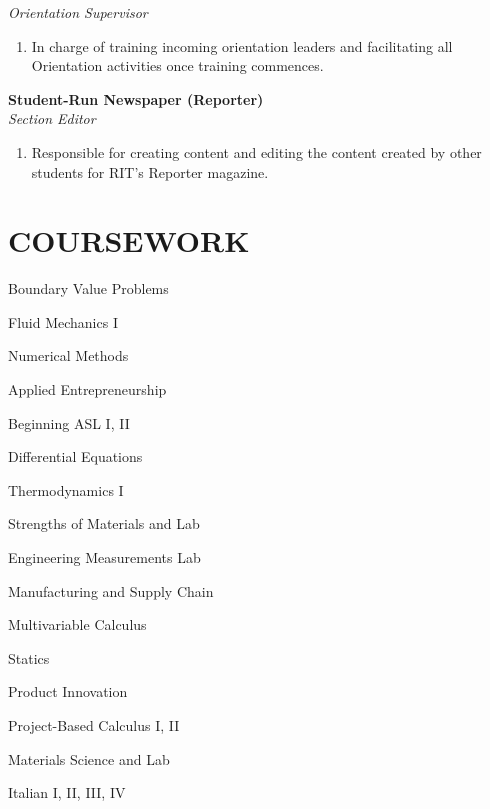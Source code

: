 \documentclass[line, resmargin]{res}
\begin{document}
\begin{resume}
\vspace{-6mm}

 \textit {Orientation Supervisor}
 \vspace{-6mm}
	\begin{enumerate}
		\item[]In charge of training incoming orientation leaders and facilitating all Orientation activities once training commences.
		\end{enumerate}
\vspace{-4mm}
\textbf{Student-Run Newspaper (Reporter)}\\
\textit {Section Editor}
\vspace{-6mm}
	\begin{enumerate}
		\item[]Responsible for creating content and editing the content created by other students for RIT’s Reporter magazine.
	\end{enumerate}
\vspace{-2.5mm}
\section{COURSEWORK}
      \begin{enumerate*}[series=MyList, before=\hspace{-0.6ex}, label=\textbullet]
        \item Boundary Value Problems
        \item Fluid Mechanics I
        \item Numerical Methods
        \item Applied Entrepreneurship
        \item Beginning ASL I, II
        \item Differential Equations
        \item Thermodynamics I
        \item Strengths of Materials and Lab
        \item Engineering Measurements Lab
        \item Manufacturing and Supply Chain
        \item Multivariable Calculus
        \item Statics
        \item Product Innovation
        \item Project-Based Calculus I, II
        \item Materials Science and Lab
        \item Italian I, II, III, IV
      \end{enumerate*}

 
\end{resume}
\end{document}
